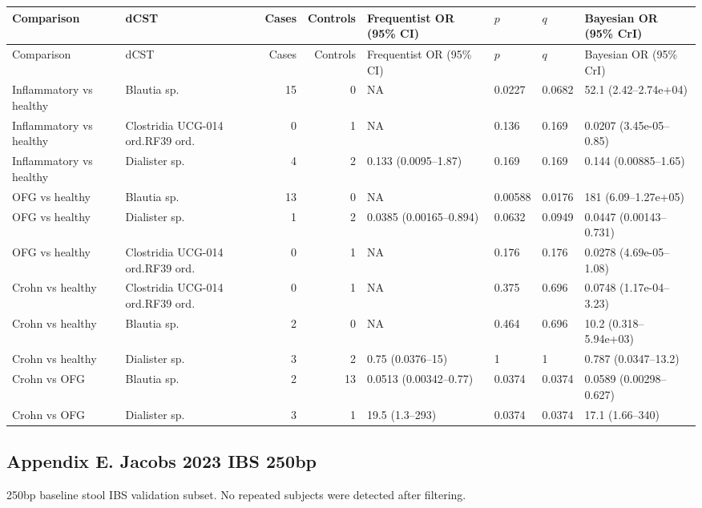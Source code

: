 \begingroup
\scriptsize
\setlength{\tabcolsep}{3pt}
\setlength{\LTleft}{0pt}
\setlength{\LTright}{0pt}
\begin{longtable}{@{} p{} p{} r r p{} p{} p{} p{} @{}}
\toprule
Comparison & dCST & Cases & Controls & Frequentist OR (95\% CI) & \(p\) & \(q\) & Bayesian OR (95\% CrI) \\
\midrule
\endfirsthead
\toprule
Comparison & dCST & Cases & Controls & Frequentist OR (95\% CI) & \(p\) & \(q\) & Bayesian OR (95\% CrI) \\
\midrule
\endhead
\bottomrule
\endfoot
Inflammatory vs healthy & Blautia sp. & 15 & 0 & NA & 0.0227 & 0.0682 & 52.1 (2.42--2.74e+04) \\
Inflammatory vs healthy & Clostridia UCG-014 ord.\dcstsep RF39 ord. & 0 & 1 & NA & 0.136 & 0.169 & 0.0207 (3.45e-05--0.85) \\
Inflammatory vs healthy & Dialister sp. & 4 & 2 & 0.133 (0.0095--1.87) & 0.169 & 0.169 & 0.144 (0.00885--1.65) \\
OFG vs healthy & Blautia sp. & 13 & 0 & NA & 0.00588 & 0.0176 & 181 (6.09--1.27e+05) \\
OFG vs healthy & Dialister sp. & 1 & 2 & 0.0385 (0.00165--0.894) & 0.0632 & 0.0949 & 0.0447 (0.00143--0.731) \\
OFG vs healthy & Clostridia UCG-014 ord.\dcstsep RF39 ord. & 0 & 1 & NA & 0.176 & 0.176 & 0.0278 (4.69e-05--1.08) \\
Crohn vs healthy & Clostridia UCG-014 ord.\dcstsep RF39 ord. & 0 & 1 & NA & 0.375 & 0.696 & 0.0748 (1.17e-04--3.23) \\
Crohn vs healthy & Blautia sp. & 2 & 0 & NA & 0.464 & 0.696 & 10.2 (0.318--5.94e+03) \\
Crohn vs healthy & Dialister sp. & 3 & 2 & 0.75 (0.0376--15) & 1 & 1 & 0.787 (0.0347--13.2) \\
Crohn vs OFG & Blautia sp. & 2 & 13 & 0.0513 (0.00342--0.77) & 0.0374 & 0.0374 & 0.0589 (0.00298--0.627) \\
Crohn vs OFG & Dialister sp. & 3 & 1 & 19.5 (1.3--293) & 0.0374 & 0.0374 & 17.1 (1.66--340) \\
\end{longtable}
\endgroup
\bigskip

\subsection*{Appendix E. Jacobs 2023 IBS 250bp}
250bp baseline stool IBS validation subset. No repeated subjects were detected after filtering.

